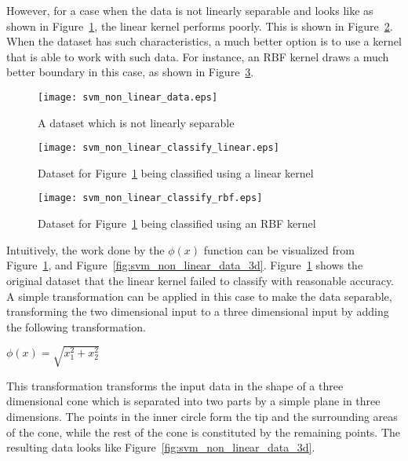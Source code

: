 However, for a case when the data is not linearly separable and looks like as shown in Figure~\ref{fig:svm_non_linear_data}, the linear kernel performs poorly. This is shown in Figure~\ref{fig:svm_non_linear_classify_linear}. When the dataset has such characteristics, a much better option is to use a kernel that is able to work with such data. For instance, an RBF kernel draws a much better boundary in this case, as shown in Figure~\ref{fig:svm_non_linear_classify_rbf}.\\

\begin{figure}[t!]
    \centering
    \texttt{[image: svm\_non\_linear\_data.eps]}
    \caption{A dataset which is not linearly separable}
    \label{fig:svm_non_linear_data}
\end{figure}

\begin{figure}[t!]
    \centering
    \texttt{[image: svm\_non\_linear\_classify\_linear.eps]}
    \caption{Dataset for Figure~\ref{fig:svm_non_linear_data} being classified using a linear kernel}
    \label{fig:svm_non_linear_classify_linear}
\end{figure}

\begin{figure}[t!]
    \centering
    \texttt{[image: svm\_non\_linear\_classify\_rbf.eps]}
    \caption{Dataset for Figure~\ref{fig:svm_non_linear_data} being classified using an RBF kernel}
    \label{fig:svm_non_linear_classify_rbf}
\end{figure}

Intuitively, the work done by the $\phi(x)$ function can be visualized from Figure~\ref{fig:svm_non_linear_data}, and Figure~\ref{fig:svm_non_linear_data_3d}. Figure~\ref{fig:svm_non_linear_data} shows the original dataset that the linear kernel failed to classify with reasonable accuracy. A simple transformation can be applied in this case to make the data separable, transforming the two dimensional input to a three dimensional input by adding the following transformation.\\

\begin{center}
    $ \phi(x) = \sqrt{x_1^2 + x_2^2} $
\end{center}

This transformation transforms the input data in the shape of a three dimensional cone which is separated into two parts by a simple plane in three dimensions. The points in the inner circle form the tip and the surrounding areas of the cone, while the rest of the cone is constituted by the remaining points. The resulting data looks like Figure~\ref{fig:svm_non_linear_data_3d}.\\

